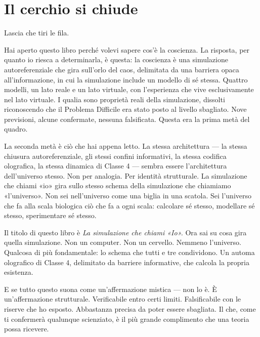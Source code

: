 \documentclass[11pt, twoside, openright]{book}
\begin{document}
\section*{Il cerchio si chiude}

Lascia che tiri le fila.

Hai aperto questo libro perché volevi sapere cos'è la coscienza. La risposta, per quanto io riesca a determinarla, è questa: la coscienza è una simulazione autoreferenziale che gira sull'orlo del caos, delimitata da una barriera opaca all'informazione, in cui la simulazione include un modello di sé stessa. Quattro modelli, un lato reale e un lato virtuale, con l'esperienza che vive esclusivamente nel lato virtuale. I qualia sono proprietà reali della simulazione, dissolti riconoscendo che il Problema Difficile era stato posto al livello sbagliato. Nove previsioni, alcune confermate, nessuna falsificata. Questa era la prima metà del quadro.

La seconda metà è ciò che hai appena letto. La stessa architettura --- la stessa chiusura autoreferenziale, gli stessi confini informativi, la stessa codifica olografica, la stessa dinamica di Classe 4 --- sembra essere l'architettura dell'universo stesso. Non per analogia. Per identità strutturale. La simulazione che chiami «io» gira sullo stesso schema della simulazione che chiamiamo «l'universo». Non sei nell'universo come una biglia in una scatola. Sei l'universo che fa alla scala biologica ciò che fa a ogni scala: calcolare sé stesso, modellare sé stesso, sperimentare sé stesso.

Il titolo di questo libro è \textit{La simulazione che chiami «Io».} Ora sai su cosa gira quella simulazione. Non un computer. Non un cervello. Nemmeno l'universo. Qualcosa di più fondamentale: lo schema che tutti e tre condividono. Un automa olografico di Classe 4, delimitato da barriere informative, che calcola la propria esistenza.

E se tutto questo suona come un'affermazione mistica --- non lo è. È un'affermazione strutturale. Verificabile entro certi limiti. Falsificabile con le riserve che ho esposto. Abbastanza precisa da poter essere sbagliata. Il che, come ti confermerà qualunque scienziato, è il più grande complimento che una teoria possa ricevere.
\end{document}
